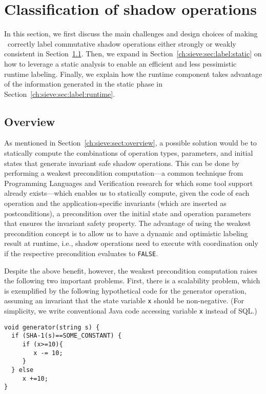 \section{Classification of shadow operations}
\label{ch:sieve:sec:label}
In this section, we first
discuss the main challenges and design choices of making
\tool\ correctly label commutative shadow operations
either strongly or weakly consistent in Section~\ref{ch:sieve:sec:label:overview}.
Then, we expand in Section~\ref{ch:sieve:sec:label:static} on how to leverage a static analysis
to enable an efficient and less pessimistic runtime labeling. Finally,
we explain how the runtime component takes advantage of the information generated
in the static phase in Section~\ref{ch:sieve:sec:label:runtime}.

\subsection{Overview}
\label{ch:sieve:sec:label:overview}
As mentioned in Section~\ref{ch:sieve:sect:overview}, 
a possible solution would be to statically compute the combinations 
of operation types, parameters, and initial states that 
generate invariant safe shadow operations.
This can be done by performing a
weakest precondition computation---a common technique from Programming Languages and Verification research for
which some tool support already exists---which enables us to 
statically compute, given the code of each operation and the application-specific invariants (which are inserted as postconditions),
a precondition over the initial state and operation parameters
that ensures the invariant safety property. The advantage of
using the weakest precondition concept is to allow us to have
a dynamic and optimistic labeling result at runtime, i.e., shadow operations
need to execute with coordination only if the respective precondition evaluates to {\tt FALSE}.

Despite the above benefit, however, the weakest precondition
computation raises the following two important problems. First, there is a scalability problem, which is exemplified by
the following hypothetical code for the generator operation,
assuming an invariant that the state variable {\tt x} should
be non-negative. (For simplicity, we write conventional Java code accessing
variable {\tt x} instead of SQL.)

\begin{verbatim}
void generator(string s) {
  if (SHA-1(s)==SOME_CONSTANT) {
     if (x>=10){
        x -= 10;
     }
  } else
     x +=10;
}
\end{verbatim}

